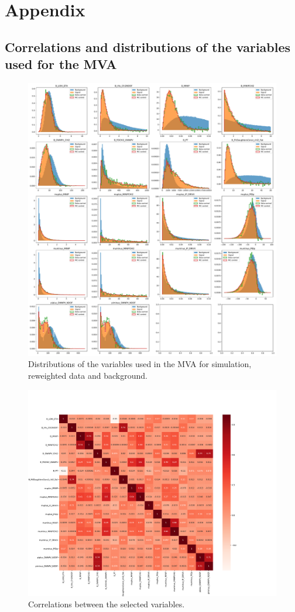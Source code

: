 \section{Appendix}
\label{sec:Appendix}
\subsection{Correlations and distributions of the variables used for the MVA}
\label{sec:Appendix1}
\centering



\begin{figure}
    \centering
    \includegraphics[width = .9\textwidth]{"content/plots/all_variables.pdf"}
    \caption{Distributions of the variables used in the MVA for simulation, reweighted data and background.}
    \label{fig:all_variables}
\end{figure}

\begin{figure}
    \centering
    \includegraphics[width = \textwidth]{"content/plots/correlations.pdf"}
    \caption{Correlations between the selected variables.}
    \label{fig:correlations}
  \end{figure}

